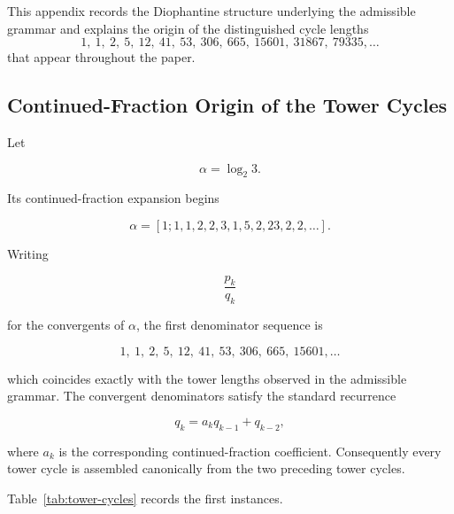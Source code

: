 \documentclass[12pt, oneside]{article}
\numberwithin{equation}{section}
\theoremstyle{definition}
\theoremstyle{plain}
\theoremstyle{remark}
\begin{document}
This appendix records the Diophantine structure underlying the admissible
grammar and explains the origin of the distinguished cycle lengths
\[
1,\ 1,\ 2,\ 5,\ 12,\ 41,\ 53,\ 306,\ 665,\ 15601,\ 31867,\ 79335,\ldots
\]
that appear throughout the paper.

\subsection{Continued-Fraction Origin of the Tower Cycles}

Let

\[
\alpha=\log_2 3.
\]

Its continued-fraction expansion begins

\[
\alpha=[1;1,1,2,2,3,1,5,2,23,2,2,\dots].
\]

Writing

\[
\frac{p_k}{q_k}
\]

for the convergents of $\alpha$, the first denominator sequence is

\[
1,\ 1,\ 2,\ 5,\ 12,\ 41,\ 53,\ 306,\ 665,\ 15601,\ldots
\]

which coincides exactly with the tower lengths observed in the admissible grammar.
The convergent denominators satisfy the standard recurrence

\[
q_k=a_k q_{k-1}+q_{k-2},
\]

where $a_k$ is the corresponding continued-fraction coefficient.
Consequently every tower cycle is assembled canonically from the two
preceding tower cycles.

Table~\ref{tab:tower-cycles} records the first instances.
\end{document}
